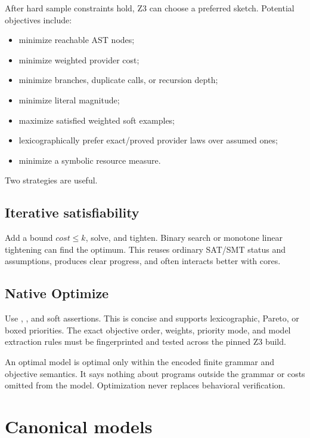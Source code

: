 \documentclass[10pt,letterpaper,oneside]{report}
\newcommand{\code}[1]{\texttt{\detokenize{#1}}}
\begin{document}
After hard sample constraints hold, Z3 can choose a preferred sketch. Potential objectives include:

\begin{itemize}
\item minimize reachable AST nodes;
\item minimize weighted provider cost;
\item minimize branches, duplicate calls, or recursion depth;
\item minimize literal magnitude;
\item maximize satisfied weighted soft examples;
\item lexicographically prefer exact/proved provider laws over assumed ones;
\item minimize a symbolic resource measure.
\end{itemize}

Two strategies are useful.

\subsection{Iterative satisfiability}

Add a bound $cost\le k$, solve, and tighten. Binary search or monotone linear tightening can find the optimum. This reuses ordinary SAT/SMT status and assumptions, produces clear progress, and often interacts better with cores.

\subsection{Native Optimize}

Use \code{minimize}, \code{maximize}, and soft assertions. This is concise and supports lexicographic, Pareto, or boxed priorities. The exact objective order, weights, priority mode, and model extraction rules must be fingerprinted and tested across the pinned Z3 build.

\begin{pitfall}
An optimal model is optimal only within the encoded finite grammar and objective semantics. It says nothing about programs outside the grammar or costs omitted from the model. Optimization never replaces behavioral verification.
\end{pitfall}

\section{Canonical models}
\end{document}
